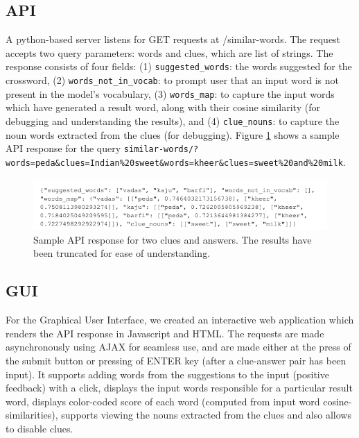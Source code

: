 \documentclass[twoside]{article}
\begin{document}
\subsection{API}
A python-based server listens for GET requests at /similar-words. The request accepts two query parameters: words and clues, which are list of strings. The response consists of four fields: (1) \verb|suggested_words|: the words suggested for the crossword, (2) \verb|words_not_in_vocab|: to prompt user that an input word is not present in the model's vocabulary, (3) \verb|words_map|: to capture the input words which have generated a result word, along with their cosine similarity (for debugging and understanding the results), and (4) \verb|clue_nouns|: to capture the noun words extracted from the clues (for debugging). Figure \ref{fig:fig5} shows a sample API response for the query \verb|similar-words/?words=peda&clues=Indian%20sweet&words=kheer&clues=sweet%20and%20milk|.
\begin{figure}
  \centering
  \includegraphics[width=\textwidth]{images/api_demo.png}
  \caption{Sample API response for two clues and answers. The results have been truncated for ease of understanding.}
  \label{fig:fig5}
\end{figure}

\subsection{GUI}
For the Graphical User Interface, we created an interactive web application which renders the API response in Javascript and HTML. The requests are made asynchronously using AJAX for seamless use, and are made either at the press of the submit button or pressing of ENTER key (after a clue-answer pair has been input). It supports adding words from the suggestions to the input (positive feedback) with a click, displays the input words responsible for a particular result word, displays color-coded score of each word (computed from input word cosine-similarities), supports viewing the nouns extracted from the clues and also allows to disable clues.
\end{document}
